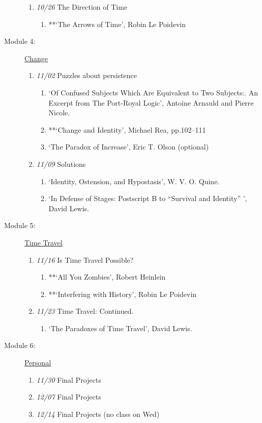 \documentclass[article,oneside]{memoir}
\begin{document}
\begin{description}
\begin{enumerate}
\item \textit{10/26} The Direction of Time
\begin{enumerate}
\item **`The Arrows of Time', Robin Le Poidevin 
\end{enumerate}
\end{enumerate}
\item[Module 4:] \href{http://scoconno.github.io/Teaching/Metaphysics/Change}{Change}
\begin{enumerate}
\item \textit{11/02} Puzzles about persistence
\begin{enumerate}
\item `Of Confused Subjects Which Are Equivalent to Two Subjects:. An Excerpt from The Port-Royal Logic', Antoine Arnauld and Pierre Nicole. 
\item **`Change and Identity', Michael Rea, pp.102--111 
\item `The Paradox of Increase', Eric T. Olson (optional)
\end{enumerate}
\item \textit{11/09} Solutions
\begin{enumerate}
 \item `Identity, Ostension, and Hypostasis', W. V. O. Quine.
\item `In Defense of Stages: Postscript B to ``Survival and Identity'' ', David Lewis.
\end{enumerate}
\end{enumerate}
\item[Module 5:] \href{http://scoconno.github.io/Teaching/Metaphysics/TT}{Time Travel}
\begin{enumerate}
\item \textit{11/16} Is Time Travel Possible?
\begin{enumerate}
\item **`All You Zombies', Robert Heinlein 
\item **`Interfering with History', Robin Le Poidevin 
\end{enumerate}
\item \textit{11/23} Time Travel: Continued.
\begin{enumerate}
\item `The Paradoxes of Time Travel', David Lewis.
\end{enumerate}
\end{enumerate}
\item[Module 6:] \href{http://scoconno.github.io/Teaching/Metaphysics/Personal}{Personal}
\begin{enumerate}
\item \textit{11/30} Final Projects
\item \textit{12/07} Final Projects
\item \textit{12/14} Final  Projects (no class on Wed)
\end{enumerate}
\end{description}
\end{document}
